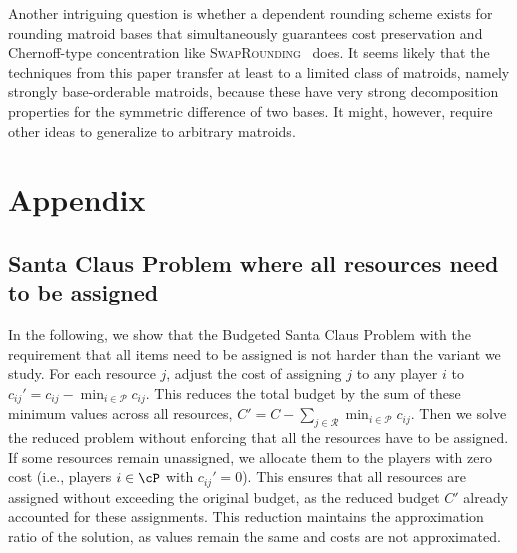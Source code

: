 \documentclass[a4paper,USenglish,cleveref,thm-restate]{lipics-v2021}
\begin{document}
Another intriguing question is whether a dependent rounding scheme exists for rounding matroid bases that simultaneously guarantees cost preservation and Chernoff-type concentration 
like \textsc{SwapRounding}~\cite{ChekuriVZ10} does. 
It seems likely that the techniques from this paper
transfer at least to a limited
class of matroids, namely strongly base-orderable
matroids, because
these have very strong decomposition properties for the
symmetric difference of two bases.
It might, however, require other ideas to generalize to
arbitrary matroids. 



\appendix
\section{Appendix}

\subsection{Santa Claus Problem where all resources need to be assigned}
\label{subsec:appendix-santa-claus-with-all-resources-assigned}
In the following, we show that the Budgeted Santa Claus Problem with the requirement that all items need to be assigned is not harder than the variant we study. 
For each resource $j$, adjust the cost of assigning $j$ to any player $i$ to $c_{ij}' = c_{ij} - \min_{i \in \mathcal{P}} c_{ij}$. This reduces the total budget by the sum of these minimum values across all resources, $C' = C - \sum_{j \in \mathcal{R}} \min_{i \in \mathcal{P}} c_{ij}$. Then we solve the reduced problem without enforcing that all the resources have to be assigned. If some resources remain unassigned, we allocate them to the players with zero cost (i.e., players $i \in \cP$ with $c_{ij}'  = 0$). This ensures that all resources are assigned without exceeding the original budget, as the reduced budget $C'$ already accounted for these assignments. This reduction maintains the approximation ratio of the solution, as values remain the same and costs are not approximated. 
\end{document}
